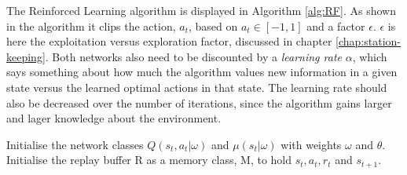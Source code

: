 The Reinforced Learning algorithm is displayed in Algorithm \ref{alg:RF}. As shown in the algorithm it clips the action, $a_{t}$, based on $a_{t} \in [-1 , 1]$ and a factor $\epsilon$. $\epsilon$ is here the exploitation versus exploration factor, discussed in chapter \ref{chap:station-keeping}. Both networks also need to be discounted by a \textit{learning rate} $\alpha$, which says something about how much the algorithm values new information in a given state versus the learned optimal actions in that state. The learning rate should also be decreased over the number of iterations, since the algorithm gains larger and lager knowledge about the environment.\\
\begin{algorithm}[H]
\SetAlgoLined
    Initialise the network classes $Q(s_{t},a_{t}|\omega)$ and $\mu(s_{t}|\omega)$ with weights $\omega$ and $\theta$.\\
    Initialise the replay buffer R as a memory class, M, to hold $s_{t}, a_{t}, r_{t}$ and $s_{t+1}$.\\
\end{algorithm}
